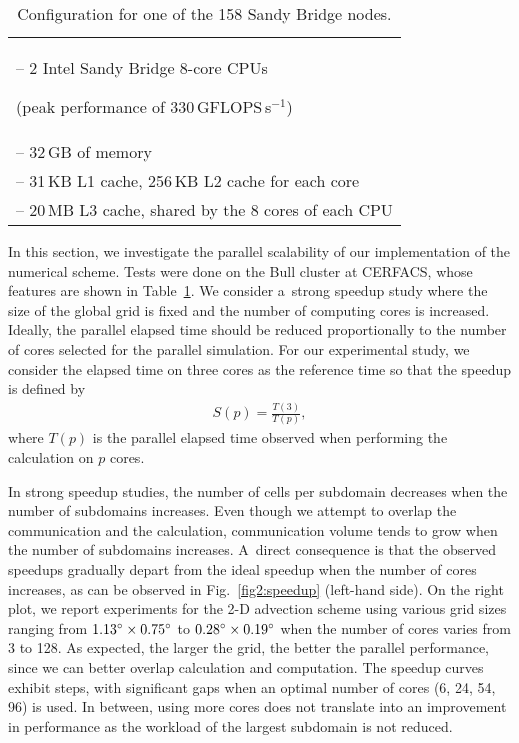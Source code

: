 \begin{table}[t]
\caption{Configuration for one of the 158 Sandy Bridge nodes.}
  \centering
\begin{tabular}{p{7cm}} 
  \toprule
-- 2 Intel Sandy Bridge 8-core CPUs\par
\quad (peak performance of 330\,GFLOPS\,s$^{-1}$)\\
-- 32\,GB of memory\\
-- 31\,KB L1 cache, 256\,KB L2 cache for each core\\
-- 20\,MB L3 cache, shared by the 8 cores of each CPU\\
\bottomrule
\end{tabular}
\label{tab:cluster}
\end{table}
   In this section, we investigate the parallel scalability of our
   implementation of the numerical scheme. Tests were done on the Bull
   cluster at CERFACS, whose features are shown in
   Table~\ref{tab:cluster}.  We consider a~strong speedup study where
   the size of the global grid is fixed and the number of computing
   cores is increased.  Ideally, the parallel elapsed time should be
   reduced proportionally to the number of cores selected for the
   parallel simulation.  For our experimental study, we consider the
   elapsed time on three cores as the reference time so that the
   speedup is defined by
\begin{align*}
 S(p) = \frac{T(3)}{T(p)},
   \end{align*}
   where $T(p)$ is the parallel elapsed time observed when performing
   the calculation on $p$ cores.

   In strong speedup studies, the number of cells per subdomain decreases when
   the number of subdomains increases. Even though we attempt to overlap the
   communication and the calculation, communication volume tends to grow when
   the number of subdomains increases. A~direct consequence is that the observed
   speedups gradually depart from the ideal speedup when the number of cores
   increases, as can be observed in Fig.~\ref{fig2:speedup} (left-hand side).
   On the right plot, we report experiments for the 2-D advection scheme using
   various grid sizes ranging from $1.13{^{\circ}} \times 0.75{^{\circ}}$ to
   $0.28{^{\circ}} \times 0.19{^{\circ}}$ when the number of cores varies from 3
   to 128. As expected, the larger the grid, the better the parallel
   performance, since we can better overlap calculation and computation. The speedup curves
   exhibit steps, with significant gaps when an optimal number of cores (6, 24,
   54, 96) is used. In between, using more cores does not translate into an
   improvement in performance as the workload of the largest subdomain is not
   reduced.


